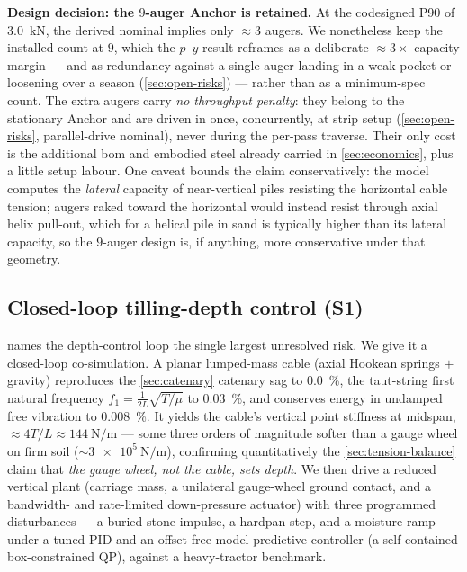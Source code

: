 \documentclass[11pt,a4paper]{article}
\begin{document}
\textbf{Design decision: the \(9\)-auger Anchor is retained.} At the codesigned P90 of \SI{3.0}{\kilo\newton}, the derived nominal implies only ${\approx}3$ augers. We nonetheless keep the installed count at \(9\), which the $p$--$y$ result reframes as a deliberate ${\approx}3\times$ capacity margin --- and as redundancy against a single auger landing in a weak pocket or loosening over a season (\cref{sec:open-risks}) --- rather than as a minimum-spec count. The extra augers carry \emph{no throughput penalty}: they belong to the stationary Anchor and are driven in once, concurrently, at strip setup (\cref{sec:open-risks}, parallel-drive nominal), never during the per-pass traverse. Their only cost is the additional \gls{bom} and embodied steel already carried in \cref{sec:economics}, plus a little setup labour. One caveat bounds the claim conservatively: the model computes the \emph{lateral} capacity of near-vertical piles resisting the horizontal cable tension; augers raked toward the horizontal would instead resist through axial helix pull-out, which for a helical pile in sand is typically higher than its lateral capacity, so the \(9\)-auger design is, if anything, more conservative under that geometry.

\subsection{Closed-loop tilling-depth control (S1)}\label{sec:v-s1}

 names the depth-control loop the single largest unresolved risk. We give it a closed-loop co-simulation. A planar lumped-mass cable (axial Hookean springs $+$ gravity) reproduces the \cref{sec:catenary} catenary sag to \SI{0.0}{\percent}, the taut-string first natural frequency $f_1 = \tfrac{1}{2L}\sqrt{T/\mu}$ to \SI{0.03}{\percent}, and conserves energy in undamped free vibration to \SI{0.008}{\percent}. It yields the cable's vertical point stiffness at midspan, ${\approx}4T/L \approx \SI{144}{\newton\per\meter}$ --- some three orders of magnitude softer than a gauge wheel on firm soil (${\sim}\SI{3e5}{\newton\per\meter}$), confirming quantitatively the \cref{sec:tension-balance} claim that \emph{the gauge wheel, not the cable, sets depth}. We then drive a reduced vertical plant (carriage mass, a unilateral gauge-wheel ground contact, and a bandwidth- and rate-limited down-pressure actuator) with three programmed disturbances --- a buried-stone impulse, a hardpan step, and a moisture ramp --- under a tuned PID and an offset-free model-predictive controller (a self-contained box-constrained QP), against a heavy-tractor benchmark.
\end{document}
